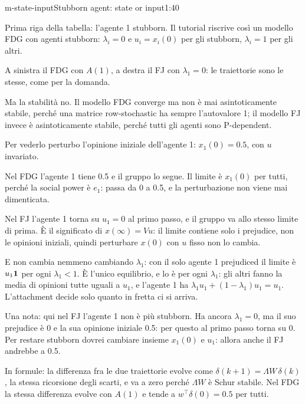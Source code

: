 \begin{slidedue}{m-state-input}{Stubborn agent: state or input}{1:40}
  \begin{discorso}
    \item Prima riga della tabella: l'agente 1 stubborn. Il tutorial riscrive così un modello FDG con agenti stubborn: $\lambda_i=0$ e $u_i=x_i(0)$ per gli stubborn, $\lambda_i=1$ per gli altri.
    \item A sinistra il FDG con $A(1)$, a destra il FJ con $\lambda_1=0$: le traiettorie sono le stesse, come per la domanda.
    \item Ma la stabilità no. Il modello FDG converge ma non è mai asintoticamente stabile, perché una matrice row-stochastic ha sempre l'autovalore 1; il modello FJ invece è asintoticamente stabile, perché tutti gli agenti sono P-dependent.
    \item \clic Per vederlo perturbo l'opinione iniziale dell'agente 1: $x_1(0)=0.5$, con $u$ invariato.
    \item Nel FDG l'agente 1 tiene 0.5 e il gruppo lo segue. Il limite è $x_1(0)$ per tutti, perché la social power è $e_1$: passa da 0 a 0.5, e la perturbazione non viene mai dimenticata.
    \item Nel FJ l'agente 1 torna su $u_1=0$ al primo passo, e il gruppo va allo stesso limite di prima. È il significato di $x(\infty)=Vu$: il limite contiene solo i prejudice, non le opinioni iniziali, quindi perturbare $x(0)$ con $u$ fisso non lo cambia.
    \item E non cambia nemmeno cambiando $\lambda_1$: con il solo agente 1 prejudiced il limite è $u_1\mathbf{1}$ per ogni $\lambda_1<1$. È l'unico equilibrio, e lo è per ogni $\lambda_1$: gli altri fanno la media di opinioni tutte uguali a $u_1$, e l'agente 1 ha $\lambda_1 u_1+(1-\lambda_1)u_1=u_1$. L'attachment decide solo quanto in fretta ci si arriva.
    \item Una nota: qui nel FJ l'agente 1 non è più stubborn. Ha ancora $\lambda_1=0$, ma il suo prejudice è 0 e la sua opinione iniziale 0.5: per questo al primo passo torna su 0. Per restare stubborn dovrei cambiare insieme $x_1(0)$ e $u_1$: allora anche il FJ andrebbe a 0.5.
    \item In formule: la differenza fra le due traiettorie evolve come $\delta(k+1)=\Lambda W\,\delta(k)$, la stessa ricorsione degli scarti, e va a zero perché $\Lambda W$ è Schur stabile. Nel FDG la stessa differenza evolve con $A(1)$ e tende a $w^\top\delta(0)=0.5$ per tutti.

\end{discorso}
\end{slidedue}
